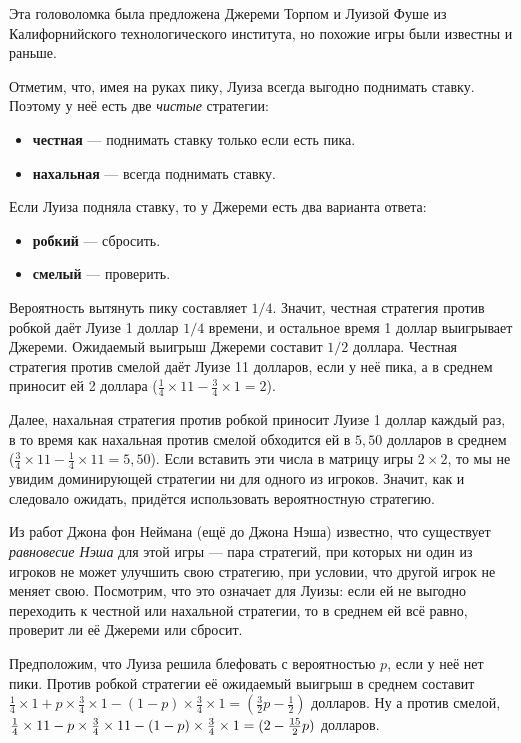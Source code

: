 Эта головоломка была предложена Джереми Торпом и Луизой Фуше из Калифорнийского технологического института, но похожие игры были известны и раньше.

Отметим, что, имея на руках пику, Луиза всегда выгодно поднимать ставку.
Поэтому у неё есть две \emph{чистые} стратегии:
\begin{itemize}
 \item \textbf{честная} --- поднимать ставку только если есть пика.
 \item \textbf{нахальная} --- всегда поднимать ставку.
\end{itemize}
Если Луиза подняла ставку, то у Джереми есть два варианта ответа:
\begin{itemize}
 \item \textbf{робкий} --- сбросить.
 \item \textbf{смелый} --- проверить.
\end{itemize}

Вероятность вытянуть пику составляет $1/4$.
Значит, честная стратегия против робкой даёт Луизе 1 доллар $1/4$ времени, и остальное время 1 доллар выигрывает Джереми.
Ожидаемый выигрыш Джереми составит $1/2$ доллара.
Честная стратегия против смелой даёт Луизе 11 долларов, если у неё пика,
а в среднем приносит ей 2 доллара ($\tfrac14 \times 11 - \tfrac 34 \times 1 = 2$).

Далее, нахальная стратегия против робкой приносит Луизе 1 доллар каждый раз,
в то время как нахальная против смелой обходится ей в $5{,}50$ долларов в среднем ($\tfrac34 \times 11- \tfrac14 \times11 = 5{,}50$).
Если вставить эти числа в матрицу игры $2 \times 2$,
то мы не увидим доминирующей стратегии ни для одного из игроков.
Значит, как и следовало ожидать, придётся использовать вероятностную стратегию.

Из работ Джона фон Неймана (ещё до Джона Нэша) известно, что существует \emph{равновесие Нэша} для этой игры --- пара стратегий, при которых ни один из игроков не может улучшить свою стратегию, при условии, что другой игрок не меняет свою.
Посмотрим, что это означает для Луизы: если ей не выгодно переходить к честной или нахальной стратегии, то в среднем ей всё равно, проверит ли её Джереми или сбросит.

Предположим, что Луиза решила блефовать с вероятностью $p$, если у неё нет пики.
Против робкой стратегии её ожидаемый выигрыш в среднем составит $\tfrac14 \times 1 + p \times \tfrac34 \times 1 - (1 - p) \times \tfrac34 \times 1 =(\tfrac32p - \tfrac12)$ долларов.
Ну а против смелой, $\tfrac14 \times 11 - p \times \tfrac34 \times 11 - (1 - p) \times \tfrac34 \times 1 \z= (2 - \tfrac{15}2p)$ долларов.

